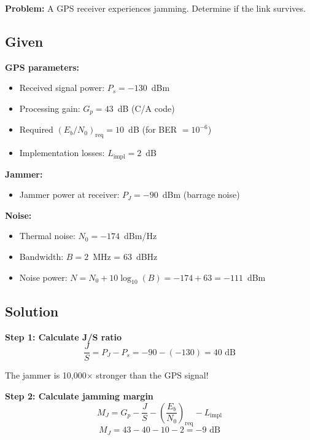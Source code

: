 \textbf{Problem:} A GPS receiver experiences jamming. Determine if the link survives.

\subsection*{Given}

\textbf{GPS parameters:}
\begin{itemize}
\item Received signal power: $P_s = -130$~dBm
\item Processing gain: $G_p = 43$~dB (C/A code)
\item Required $(E_b/N_0)_{\mathrm{req}} = 10$~dB (for BER $= 10^{-6}$)
\item Implementation losses: $L_{\mathrm{impl}} = 2$~dB
\end{itemize}

\textbf{Jammer:}
\begin{itemize}
\item Jammer power at receiver: $P_J = -90$~dBm (barrage noise)
\end{itemize}

\textbf{Noise:}
\begin{itemize}
\item Thermal noise: $N_0 = -174$~dBm/Hz
\item Bandwidth: $B = 2$~MHz = 63~dBHz
\item Noise power: $N = N_0 + 10\log_{10}(B) = -174 + 63 = -111$~dBm
\end{itemize}

\subsection*{Solution}

\textbf{Step 1: Calculate J/S ratio}
\begin{equation}
\frac{J}{S} = P_J - P_s = -90 - (-130) = 40\text{ dB}
\end{equation}

The jammer is 10,000$\times$ stronger than the GPS signal!

\textbf{Step 2: Calculate jamming margin}
\begin{equation}
M_J = G_p - \frac{J}{S} - \left(\frac{E_b}{N_0}\right)_{\mathrm{req}} - L_{\mathrm{impl}}
\end{equation}
\begin{equation}
M_J = 43 - 40 - 10 - 2 = -9\text{ dB}
\end{equation}

